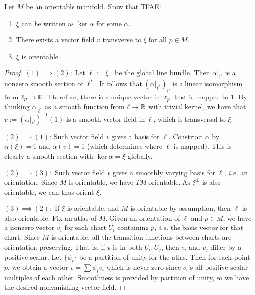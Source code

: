 \documentclass[12pt]{article}
\begin{document}
\begin{problem}[2] Let $ M$ be an orientable manifold. Show that TFAE:
\begin{enumerate}[label=(\arabic*)]
	\item $ \xi$ can be written as $ \ker \alpha$ for some $ \alpha$.
	\item There exists a vector field $ v$ transverse to  $ \xi$ for all $ p \in M$.
	\item $ \xi$ is orientable.
\end{enumerate}
\begin{proof}
	$ (1) \implies (2):$ Let $ \ell := \xi^{\perp}$ be the global line bundle. Then $ \alpha|_{\ell^*}$ is a nonzero smooth section of $ \ell^*$. It follows that $ (\alpha|_{\ell^* })_p$ is a linear isomorphism from $ \ell_p \to \mathbb{R}$. Therefore, there is a unique vector in $ \ell_p$ that is mapped to $ 1$. By thinking $ \alpha|_{\ell^* }$ as a smooth function from $ \ell \to \mathbb{R}$ with trivial kernel, we have that $v:= (\alpha|_{\ell^* })^{-1}(1)$ is a smooth vector field in $ \ell$, which is transversal to $ \xi$.

	$ (2) \implies (1)$: Such vector field $ v$ gives a basis for $ \ell$. Construct $ \alpha$ by $ \alpha(\xi) = 0$ and $ \alpha(v) = 1$ (which determines where $ \ell$ is mapped). This is clearly a smooth section with $ \ker \alpha = \xi$ globally.

	$ (2) \implies (3):$ Such vector field $ v$ gives a smoothly varying basis for  $ \ell$, \emph{i.e.} an orientation. Since $ M$ is orientable, we have $ TM$ orientable. As $ \xi^{\perp}$ is also orientable, we can thus orient $ \xi$.

	$ (3) \implies (2):$ If $ \xi$ is orientable, and $ M$ is orientable by assumption, then  $ \ell$ is also orientable. Fix an atlas of $ M$. Given an orientation of $ \ell$ and $ p \in M$, we have a nonzero vector $ v_i$ for each chart $ U_i$ containing $ p$, \emph{i.e.} the basis vector for that chart. Since $ M$ is orientable, all the transition functions between charts are orientation preserving. That is, if $ p$ is in both  $ U_i,U_j$, then $ v_i$ and $ v_j$ differ by a positive scalar. Let $ \{\phi_i\} $ be a partition of unity for the atlas. Then for each point $ p$, we obtain a vector  $ v = \sum \phi_i v_i$ which is never zero since $ v_i$'s all positive scalar multiples of each other. Smoothness is provided by partition of unity, so we have the desired nonvanishing vector field.
\end{proof}

\end{problem}
\end{document}
